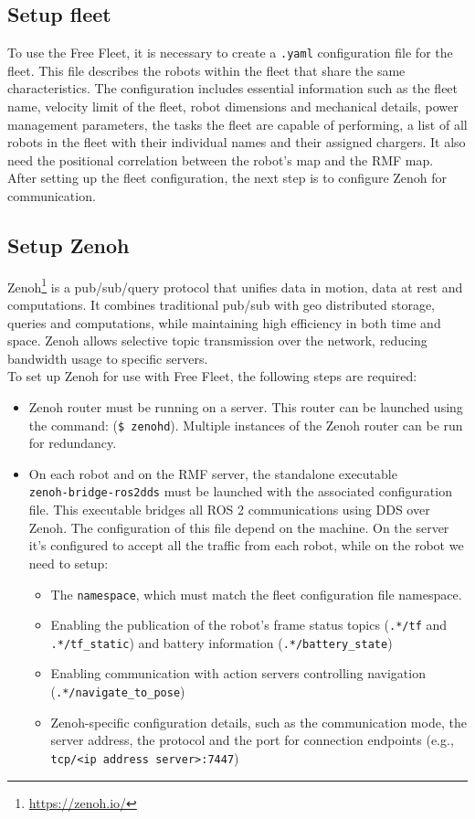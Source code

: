 \subsection{Setup fleet}
To use the Free Fleet, it is necessary to create a \texttt{.yaml} configuration file for the fleet. This file describes the robots within the fleet that share the same characteristics. The configuration includes essential information such as the fleet name, velocity limit of the fleet, robot dimensions and mechanical details, power management parameters, the tasks the fleet are capable of performing, a list of all robots in the fleet with their individual names and their assigned chargers. It also need the positional correlation between the robot’s map and the RMF map.\\
After setting up the fleet configuration, the next step is to configure Zenoh for communication.
\subsection{Setup Zenoh}
Zenoh\footnote{\href{https://zenoh.io/}{https://zenoh.io/}} is a pub/sub/query protocol that unifies data in motion, data at rest and computations. It combines traditional pub/sub with geo distributed storage, queries and computations, while maintaining high efficiency in both time and space. Zenoh allows selective topic transmission over the network, reducing bandwidth usage to specific servers.\\
To set up Zenoh for use with Free Fleet, the following steps are required:
\begin{itemize}
	\item Zenoh router must be running on a server. This router can be launched using the command: (\texttt{\$ zenohd}). Multiple instances of the Zenoh router can be run for redundancy.
	\item On each robot and on the RMF server, the standalone executable\\ \texttt{zenoh-bridge-ros2dds} must be launched with the associated configuration file. This executable bridges all ROS 2 communications using DDS over Zenoh. The configuration of this file depend on the machine. On the server it's configured to accept all the traffic from each robot, while on the robot we need to setup:
		\begin{itemize}
		 \item The \texttt{namespace}, which must match the fleet configuration file namespace.
		 \item Enabling the publication of the robot’s frame status topics (\texttt{.*/tf} and \texttt{.*/tf\_static}) and battery information (\texttt{.*/battery\_state})
		 \item Enabling communication with action servers controlling navigation\\ (\texttt{.*/navigate\_to\_pose})
		 \item Zenoh-specific configuration details, such as the communication mode, the server address, the protocol and the port for connection endpoints (e.g., \texttt{tcp/<ip address server>:7447})
		\end{itemize}
\end{itemize}
